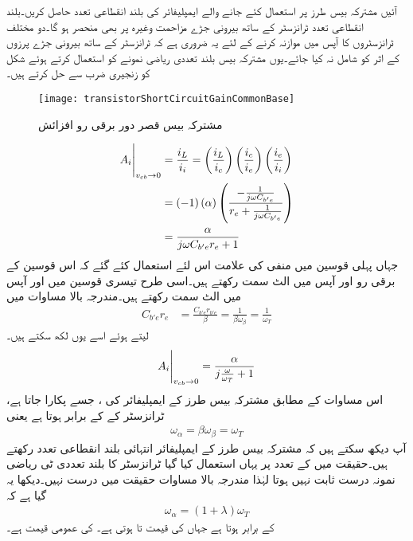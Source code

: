 آئیں مشترکہ بیس  طرز پر استعمال کئے جانے والے ایمپلیفائر کی بلند انقطاعی تعدد حاصل کریں۔بلند انقطاعی تعدد ٹرانزسٹر کے ساتھ بیرونی جڑے مزاحمت وغیرہ پر بھی منحصر ہو گا۔دو مختلف ٹرانزسٹروں کا آپس میں موازنہ کرنے کے لئے یہ ضروری ہے کہ ٹرانزسٹر کے ساتھ بیرونی جڑے پرزوں کے اثر کو شامل نہ کیا جائے۔یوں مشترکہ بیس  بلند تعددی ریاضی نمونے کو استعمال کرتے ہوئے شکل  کو زنجیری ضرب سے حل کرتے ہیں۔
\begin{figure}
\centering
\texttt{[image: transistorShortCircuitGainCommonBase]}
\caption{مشترکہ بیس  قصر دور برقی رو افزائش}
\label{شکل_تعددی_ردعمل_مشترکہ_قابو_کسر_دور_افزائش}
\end{figure}
%
\begin{align*}
\eval{A_i}_{v_{cb} \to 0} &=\frac{i_L}{i_i}=\left(\frac{i_L}{i_c} \right) \left(\frac{i_c}{i_e} \right) \left(\frac{i_e}{i_i} \right)\\
&=\left(-1 \right) \left(\alpha \right) \left(\frac{-\frac{1}{j \omega C_{b'e}}}{r_e+\frac{1}{j \omega C_{b'e}}} \right)\\
&=\frac{\alpha}{j \omega C_{b'e} r_e +1}
\end{align*}
جہاں پہلی قوسین میں منفی کی علامت اس لئے استعمال کئے گئے کہ اس قوسین کے برقی رو  اور  آپس میں الٹ سمت رکھتے ہیں۔اسی طرح تیسری قوسین میں  اور  آپس میں الٹ سمت رکھتے ہیں۔مندرجہ بالا مساوات میں
\begin{align*}
C_{b'e} r_e &= \frac{C_{b'e} r_{b'e}}{\beta} =\frac{1}{\beta \omega_{\beta}}=\frac{1}{\omega_T}
\end{align*}
لیتے ہوئے اسے یوں لکھ سکتے ہیں۔
\begin{align}
\eval{A_i}_{v_{cb} \to 0}=\frac{ \alpha}{j\frac{\omega}{\omega_T}+1}
\end{align}
اس مساوات کے مطابق مشترکہ بیس  طرز کے ایمپلیفائر کی ، جسے  پکارا جاتا ہے، ٹرانزسٹر کے  کے برابر ہوتا ہے یعنی
\begin{align} \label{مساوات_تعددی_ردعمل_مشترکہ_قابو_بلند_انقطاعی_نکتہ}
\omega_{\alpha}=\beta \omega_{\beta}=\omega_T
\end{align}
آپ دیکھ سکتے ہیں کہ مشترکہ بیس  طرز کے ایمپلیفائر انتہائی بلند انقطاعی تعدد رکھتے ہیں۔حقیقت میں  کے تعدد پر یہاں استعمال کیا گیا ٹرانزسٹر کا بلند تعددی ٹی ریاضی نمونہ درست ثابت نہیں ہوتا لہٰذا مندرجہ بالا مساوات حقیقت میں درست نہیں۔دیکھا یہ گیا ہے کہ
\begin{align}
\omega_{\alpha}=\left(1+\lambda \right) \omega_T
\end{align}
کے برابر ہوتا ہے جہاں  کی قیمت  تا  ہوتی ہے۔ کی عمومی قیمت  ہے۔
 
